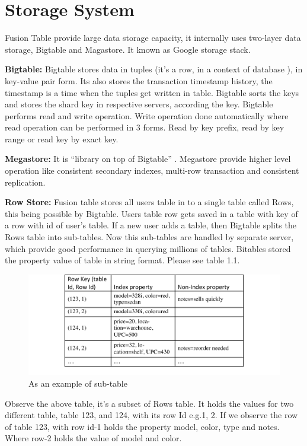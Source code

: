 \documentclass[9pt,twocolumn,twoside]{styles/osajnl}
\begin{document}
\section{Storage System}

Fusion Table provide large data storage capacity, it internally uses two-layer data storage, Bigtable and Magastore. It known as Google storage stack.

\textbf{Bigtable:} Bigtable stores data in tuples (it’s a row, in a context of database ), in key-value pair form. Its also stores the transaction timestamp history, the timestamp is a time when the tuples get written in table. Bigtable sorts the keys and stores the shard key in respective servers, according the key. Bigtable performs read and write operation. Write operation done automatically where read operation can be performed in 3 forms. Read by key prefix, read by key range or read key by exact key. 

\textbf{Megastore:}  It is “library on top of Bigtable” \cite{www-6}. Megastore provide higher level operation like consistent secondary indexes, multi-row transaction and consistent replication.

\textbf{Row Store:} Fusion table stores all users table in to a single table called Rows, this being possible by Bigtable. Users table row gets saved in a table with key of a row with id of user’s table. If a new user adds a table, then Bigtable splits the Rows table into sub-tables. Now this sub-tables are handled by separate server, which provide good performance in querying millions of tables. Bitables stored the property value of table in string format. Please see table 1.1.

\begin{figure}[htbp]
	\centering
	\includegraphics[width=\linewidth]{images/table1}
	\caption{As an example of sub-table}
	\label{fig:false-color}
\end{figure}


Observe the above table, it’s a subset of Rows table. It holds the values for two different table, table 123, and 124, with its row Id e.g.1, 2. If we observe the row of table 123, with row id-1 holds the property model, color, type and notes. Where row-2 holds the value of model and color.
\end{document}
